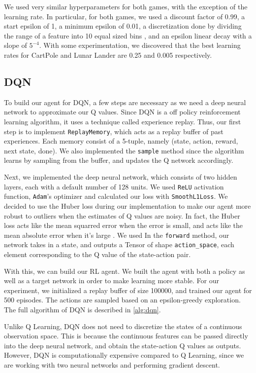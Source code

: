\documentclass{article}
\begin{document}
We used very similar hyperparameters for both games, with the exception of the
learning rate. In particular, for both games, we used a discount factor of
0.99, a start epsilon of 1, a minimum epsilon of 0.01, a discretization done by
dividing the range of a feature into 10 equal sized bins
\cite{discretization_tech}, and an epsilon linear decay with a slope of
\(5^{-4}\). With some experimentation, we discovered that the best learning
rates for CartPole and Lunar Lander are 0.25 and 0.005 respectively.

\subsection{DQN}
To build our agent for DQN, a few steps are necessary as we need a deep neural
network to approximate our Q values. Since DQN is a off policy reinforcement
learning algorithm, it uses a technique called experience replay. Thus, our
first step is to implement \verb+ReplayMemory+, which acts as a replay buffer
of past experiences. Each memory consist of a 5-tuple, namely (state, action,
reward, next state, done). We also implemented the \verb+sample+ method since
the algorithm learns by sampling from the buffer, and updates the Q network
accordingly.

Next, we implemented the deep neural network, which consists of two hidden
layers, each with a default number of 128 units. We used \verb+ReLU+ activation
function, \verb+Adam+'s optimizer and calculated our loss with
\verb+SmoothL1Loss+. We decided to use the Huber loss during our implementation
to make our agent more robust to outliers when the estimates of Q values are
noisy. In fact, the Huber loss acts like the mean squarred error when the error
is small, and acts like the mean absolute error when it's large \cite{hubert}.
We used In the \verb+forward+ method, our network takes in a state, and outputs
a Tensor of shape \verb+action_space+, each element corresponding to the Q
value of the state-action pair.

With this, we can build our RL agent. We built the agent with both a policy as
well as a target network in order to make learning more stable. For our
experiment, we initialized a replay buffer of size 100000, and trained our
agent for 500 episodes. The actions are sampled based on an epsilon-greedy
exploration. The full algorithm of DQN is described in \cref{alg:dqn}.

Unlike Q Learning, DQN does not need to discretize the states of a continuous
observation space. This is because the continuous features can be passed
directly into the deep neural network, and obtain the state-action Q values as
outputs. However, DQN is computationally expensive compared to Q Learning,
since we are working with two neural networks and performing gradient descent.
\end{document}
